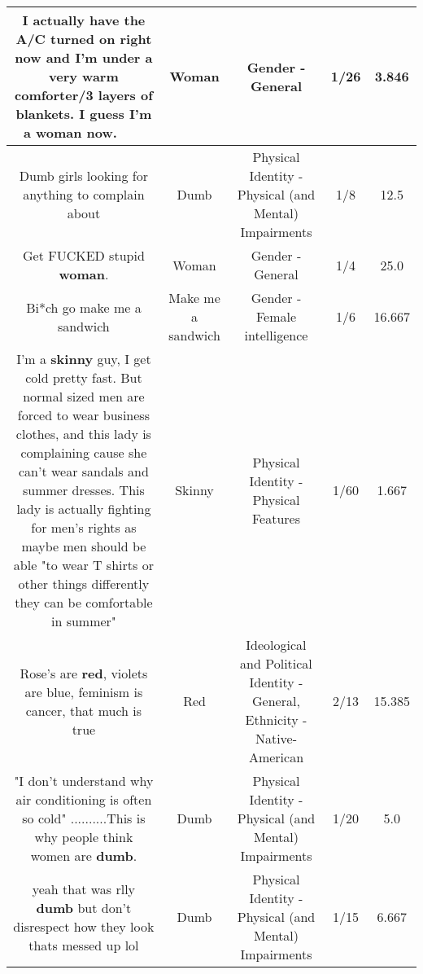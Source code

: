 \documentclass[11pt]{article}
\newlength\mylength
\begin{document}
\begin{center}
\begin{longtable}{|C{.65\mylength}|C{.30\mylength}|C{.12\mylength}|C{.12\mylength}|C{.12\mylength}|}
  \small I actually have the A/C turned on right now and I'm under a very warm comforter/3 layers of blankets. I guess I'm a \textbf{woman} now. 💁🏻‍♂️🤷🏼‍♂️\normalsize   & Woman & Gender - General & 1/26 & 3.846 \\  \hline
  \small Dumb girls looking for anything to complain about\normalsize   & Dumb & Physical Identity - Physical (and Mental) Impairments & 1/8 & 12.5 \\  \hline
  \small Get FUCKED stupid \textbf{woman}.\normalsize   & Woman & Gender - General & 1/4 & 25.0 \\  \hline
  \small Bi*ch go make me a sandwich\normalsize   & Make me a sandwich & Gender - Female intelligence & 1/6 & 16.667 \\  \hline
  \small I'm a \textbf{skinny} guy, I get cold pretty fast. But normal sized men are forced to wear business clothes, and this lady is complaining cause she can't wear sandals and summer dresses. This lady is actually fighting for men's rights as maybe men should be able "to wear T shirts or other things differently they can be comfortable in summer"\normalsize   & Skinny & Physical Identity - Physical Features & 1/60 & 1.667 \\  \hline
  \small Rose's are \textbf{r\textbf{ed}}, violets are blue, feminism is cancer, that much is true\normalsize   & Red &  Ideological and Political Identity - General, Ethnicity - Native-American & 2/13 & 15.385 \\  \hline
  \small "I don't understand why air conditioning is often so cold" ..........This is why people think women are \textbf{dumb}.\normalsize   & Dumb & Physical Identity - Physical (and Mental) Impairments & 1/20 & 5.0 \\  \hline
  \small yeah that was rlly \textbf{dumb} but don't disrespect how they look thats messed up lol\normalsize   & Dumb & Physical Identity - Physical (and Mental) Impairments & 1/15 & 6.667 \\  \hline

\end{longtable}
\end{center}
\end{document}
